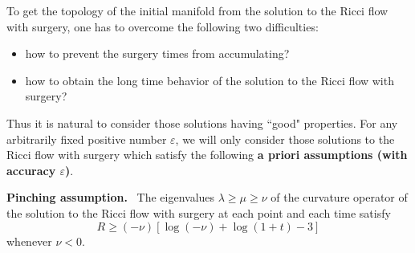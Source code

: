 To get the topology of the initial manifold from the solution to
the Ricci flow with surgery, one has to overcome the following two
difficulties:
\begin{itemize}
\item[(i)] how to prevent the surgery times from accumulating?
\item[(ii)] how to obtain the long time behavior of the solution
to the Ricci flow with surgery?
\end{itemize}

Thus it is natural to consider those solutions having ``good"
properties. For any arbitrarily fixed positive number
$\varepsilon$, we will only consider those solutions to the Ricci
flow with surgery which satisfy the following \textbf{a priori
assumptions (with accuracy $\varepsilon$)}.

\medskip
{\bf Pinching assumption.} \ The
eigenvalues $\lambda \geq \mu \geq \nu$ of the curvature operator
of the solution to the Ricci flow with surgery at each point and
each time satisfy \begin{equation}
R \geq (-\nu)[\log(-\nu) + \log(1+t) -3] %
\end{equation} whenever $\nu < 0$.

